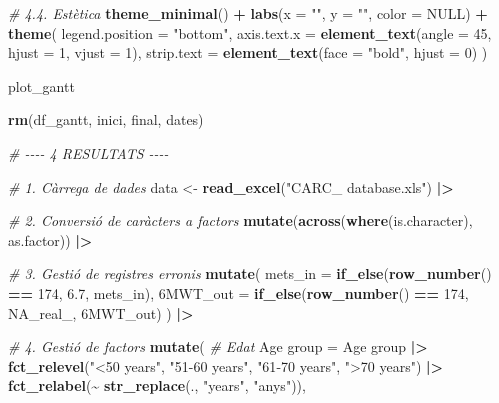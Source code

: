 \documentclass[CAT]{TFUOC}%
\newenvironment{Shaded}{\begin{snugshade}}{\end{snugshade}}
\newcommand{\AttributeTok}[1]{\textcolor[rgb]{0.13,0.29,0.53}{#1}}
\newcommand{\CommentTok}[1]{\textcolor[rgb]{0.56,0.35,0.01}{\textit{#1}}}
\newcommand{\ConstantTok}[1]{\textcolor[rgb]{0.56,0.35,0.01}{#1}}
\newcommand{\DecValTok}[1]{\textcolor[rgb]{0.00,0.00,0.81}{#1}}
\newcommand{\FloatTok}[1]{\textcolor[rgb]{0.00,0.00,0.81}{#1}}
\newcommand{\FunctionTok}[1]{\textcolor[rgb]{0.13,0.29,0.53}{\textbf{#1}}}
\newcommand{\NormalTok}[1]{#1}
\newcommand{\OtherTok}[1]{\textcolor[rgb]{0.56,0.35,0.01}{#1}}
\newcommand{\SpecialCharTok}[1]{\textcolor[rgb]{0.81,0.36,0.00}{\textbf{#1}}}
\newcommand{\StringTok}[1]{\textcolor[rgb]{0.31,0.60,0.02}{#1}}
\begin{document}
\begin{Shaded}
\begin{Highlighting}[]
  \CommentTok{\# 4.4. Estètica}
  \FunctionTok{theme\_minimal}\NormalTok{() }\SpecialCharTok{+}
  \FunctionTok{labs}\NormalTok{(}\AttributeTok{x =} \StringTok{""}\NormalTok{, }\AttributeTok{y =} \StringTok{""}\NormalTok{, }\AttributeTok{color =} \ConstantTok{NULL}\NormalTok{) }\SpecialCharTok{+}
  \FunctionTok{theme}\NormalTok{(}
    \AttributeTok{legend.position =} \StringTok{"bottom"}\NormalTok{,}
    \AttributeTok{axis.text.x =} \FunctionTok{element\_text}\NormalTok{(}\AttributeTok{angle =} \DecValTok{45}\NormalTok{, }\AttributeTok{hjust =} \DecValTok{1}\NormalTok{, }
                               \AttributeTok{vjust =} \DecValTok{1}\NormalTok{),}
    \AttributeTok{strip.text =} \FunctionTok{element\_text}\NormalTok{(}\AttributeTok{face =} \StringTok{"bold"}\NormalTok{, }\AttributeTok{hjust =} \DecValTok{0}\NormalTok{)}
\NormalTok{  )}

\NormalTok{plot\_gantt}

\FunctionTok{rm}\NormalTok{(df\_gantt, inici, final, dates)}

\CommentTok{\# {-}{-}{-}{-} 4 RESULTATS {-}{-}{-}{-}}

\CommentTok{\# 1. Càrrega de dades}
\NormalTok{data }\OtherTok{\textless{}{-}} \FunctionTok{read\_excel}\NormalTok{(}\StringTok{"CARC\_ database.xls"}\NormalTok{) }\SpecialCharTok{|\textgreater{}} 
  
  \CommentTok{\# 2. Conversió de caràcters a factors}
  \FunctionTok{mutate}\NormalTok{(}\FunctionTok{across}\NormalTok{(}\FunctionTok{where}\NormalTok{(is.character), as.factor)) }\SpecialCharTok{|\textgreater{}} 
  
  \CommentTok{\# 3. Gestió de registres erronis}
  \FunctionTok{mutate}\NormalTok{(}
    \AttributeTok{mets\_in =} \FunctionTok{if\_else}\NormalTok{(}\FunctionTok{row\_number}\NormalTok{() }\SpecialCharTok{==} \DecValTok{174}\NormalTok{, }\FloatTok{6.7}\NormalTok{, mets\_in),}
    \StringTok{\textasciigrave{}}\AttributeTok{6MWT\_out}\StringTok{\textasciigrave{}} \OtherTok{=} \FunctionTok{if\_else}\NormalTok{(}\FunctionTok{row\_number}\NormalTok{() }\SpecialCharTok{==} \DecValTok{174}\NormalTok{, }\ConstantTok{NA\_real\_}\NormalTok{, }\StringTok{\textasciigrave{}}\AttributeTok{6MWT\_out}\StringTok{\textasciigrave{}}\NormalTok{)}
\NormalTok{  ) }\SpecialCharTok{|\textgreater{}} 
  
  \CommentTok{\# 4. Gestió de factors}
  \FunctionTok{mutate}\NormalTok{(}
    \CommentTok{\# Edat}
    \StringTok{\textasciigrave{}}\AttributeTok{Age group}\StringTok{\textasciigrave{}} \OtherTok{=} \StringTok{\textasciigrave{}}\AttributeTok{Age group}\StringTok{\textasciigrave{}} \SpecialCharTok{|\textgreater{}} 
      \FunctionTok{fct\_relevel}\NormalTok{(}\StringTok{"\textless{}50 years"}\NormalTok{, }\StringTok{"51{-}60 years"}\NormalTok{, }\StringTok{"61{-}70 years"}\NormalTok{, }\StringTok{"\textgreater{}70 years"}\NormalTok{) }\SpecialCharTok{|\textgreater{}} 
      \FunctionTok{fct\_relabel}\NormalTok{(}\SpecialCharTok{\textasciitilde{}} \FunctionTok{str\_replace}\NormalTok{(., }\StringTok{"years"}\NormalTok{, }\StringTok{"anys"}\NormalTok{)),}
    

\end{Highlighting}
\end{Shaded}
\end{document}
